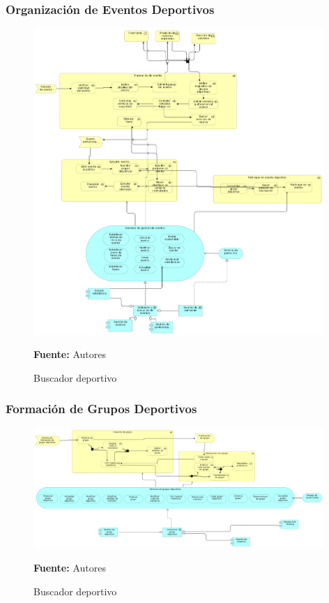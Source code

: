 \subsubsection{Organización de Eventos Deportivos}

\begin{figure}[!htb]
  \begin{center}
    \includegraphics[width=11cm]{./imagenes/application_usage/organizacioneventosdeportivos.png}
    \caption{Buscador deportivo}
    \label{fig:BF_BuscadorDeportivo}
    \textbf{Fuente:}  Autores
  \end{center}
\end{figure}

\subsubsection{Formación de Grupos Deportivos}

\begin{figure}[!htb]
  \begin{center}
    \includegraphics[width=11cm]{./imagenes/application_usage/formaciongruposdeportivos.png}
    \caption{Buscador deportivo}
    \label{fig:BF_BuscadorDeportivo}
    \textbf{Fuente:}  Autores
  \end{center}
\end{figure}

